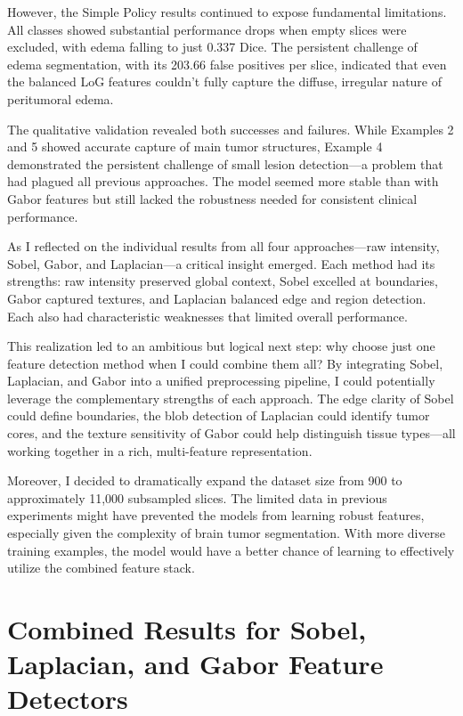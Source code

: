 However, the Simple Policy results continued to expose fundamental limitations. All classes showed substantial performance drops when empty slices were excluded, with edema falling to just 0.337 Dice. The persistent challenge of edema segmentation, with its 203.66 false positives per slice, indicated that even the balanced LoG features couldn't fully capture the diffuse, irregular nature of peritumoral edema.

The qualitative validation revealed both successes and failures. While Examples 2 and 5 showed accurate capture of main tumor structures, Example 4 demonstrated the persistent challenge of small lesion detection—a problem that had plagued all previous approaches. The model seemed more stable than with Gabor features but still lacked the robustness needed for consistent clinical performance.

As I reflected on the individual results from all four approaches—raw intensity, Sobel, Gabor, and Laplacian—a critical insight emerged. Each method had its strengths: raw intensity preserved global context, Sobel excelled at boundaries, Gabor captured textures, and Laplacian balanced edge and region detection. Each also had characteristic weaknesses that limited overall performance.

This realization led to an ambitious but logical next step: why choose just one feature detection method when I could combine them all? By integrating Sobel, Laplacian, and Gabor into a unified preprocessing pipeline, I could potentially leverage the complementary strengths of each approach. The edge clarity of Sobel could define boundaries, the blob detection of Laplacian could identify tumor cores, and the texture sensitivity of Gabor could help distinguish tissue types—all working together in a rich, multi-feature representation.

Moreover, I decided to dramatically expand the dataset size from 900 to approximately 11,000 subsampled slices. The limited data in previous experiments might have prevented the models from learning robust features, especially given the complexity of brain tumor segmentation. With more diverse training examples, the model would have a better chance of learning to effectively utilize the combined feature stack.

\section{Combined Results for Sobel, Laplacian, and Gabor Feature Detectors}
\label{sec:combined_fd_results}

